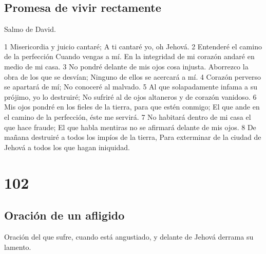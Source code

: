 \section*{Promesa de vivir rectamente}

Salmo de David.

1 Misericordia y juicio cantaré;
A ti cantaré yo, oh Jehová.
2 Entenderé el camino de la perfección
Cuando vengas a mí.
En la integridad de mi corazón andaré en medio de mi casa.
3 No pondré delante de mis ojos cosa injusta.
Aborrezco la obra de los que se desvían;
Ninguno de ellos se acercará a mí.
4 Corazón perverso se apartará de mí;
No conoceré al malvado.
5 Al que solapadamente infama a su prójimo, yo lo destruiré;
No sufriré al de ojos altaneros y de corazón vanidoso.
6 Mis ojos pondré en los fieles de la tierra, para que estén conmigo;
El que ande en el camino de la perfección, éste me servirá.
7 No habitará dentro de mi casa el que hace fraude;
El que habla mentiras no se afirmará delante de mis ojos.
8 De mañana destruiré a todos los impíos de la tierra,
Para exterminar de la ciudad de Jehová a todos los que hagan iniquidad.

\chapter{102}

\section*{Oración de un afligido}

Oración del que sufre, cuando está angustiado, y delante de Jehová derrama su lamento.

